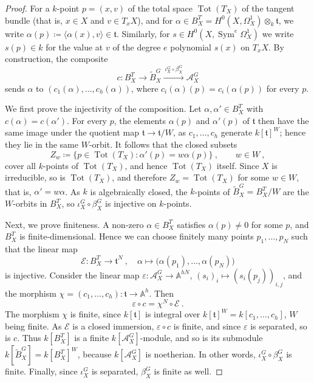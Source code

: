 \documentclass[11pt, a4paper]{amsart}
\theoremstyle{definition}
\theoremstyle{myitemstyle}
\newcommand{\A}{\mathbb{A}}
\newcommand{\mc}[1]{{\mathcal{#1}}}
\DeclareMathOperator{\Sym}{Sym}
\begin{document}
\begin{proof}
For a $k$-point $p=(x,v)$ of the total space $\operatorname{Tot}(T_X)$ of the tangent bundle  (that is, $x\in X$ and $v\in T_xX$), and for $\alpha\in B^T_X=H^0(X,\Omega^1_X)\otimes_k\mathfrak t$, we write $\alpha(p)\coloneqq\langle\alpha(x),v\rangle\in\mathfrak t$. Similarly, for $s\in H^0(X,\Sym^e\Omega^1_X)$ we write $s(p)\in k$ for the value at $v$ of the degree $e$ polynomial $s(x)$ on $T_xX$. By construction, the composite
\[
    c\colon B^T_X\longrightarrow\widetilde B^G_X\xrightarrow{\ \iota^G_X\circ\beta^G_X\ }\mc A^G_X
\]
sends $\alpha$ to $(c_1(\alpha),\ldots,c_h(\alpha))$, where $c_i(\alpha)(p)=c_i(\alpha(p))$ for every $p$.
 
We first prove the  injectivity of the composition. Let $\alpha,\alpha'\in B^T_X$ with $c(\alpha)=c(\alpha')$. For every $p$, the elements $\alpha(p)$ and $\alpha'(p)$ of $\mathfrak t$ then have the same image under the quotient map $\mathfrak t\to\mathfrak t/W$, as $c_1,\ldots,c_h$ generate $k[\mathfrak t]^W$; hence they lie in the same $W$-orbit. It follows that the closed subsets
\[
    Z_w\coloneqq\{p\in\operatorname{Tot}(T_X):\alpha'(p)=w\alpha(p)\}\ ,\qquad w\in W\ ,
\]
cover all $k$-points of $\operatorname{Tot}(T_X)$, and hence $\operatorname{Tot}(T_X)$ itself. Since $X$ is irreducible, so is $\operatorname{Tot}(T_X)$, and therefore $Z_w=\operatorname{Tot}(T_X)$ for some $w\in W$, that is, $\alpha'=w\alpha$. As $k$ is algebraically closed, the $k$-points of $\widetilde B^G_X=B^T_X/W$ are the $W$-orbits in $B^T_X$, so $\iota^G_X\circ\beta^G_X$ is injective on $k$-points.
 
Next, we  prove finiteness. A non-zero $\alpha\in B^T_X$ satisfies $\alpha(p)\neq0$ for some $p$, and $B^T_X$ is finite-dimensional. Hence we can choose finitely many points $p_1,\ldots,p_N$ such that the linear map
\[
    \mathcal{E}\colon B^T_X\longrightarrow\mathfrak t^N\ ,\quad\alpha\longmapsto\big(\alpha(p_1),\ldots,\alpha(p_N)\big)
\]
is injective. Consider the linear map $\varepsilon\colon\mc A^G_X\to\A^{hN}$, $(s_i)_i\mapsto(s_i(p_j))_{i,j}$, and the morphism $\chi=(c_1,\ldots,c_h)\colon\mathfrak t\to\A^h$. Then
\[
    \varepsilon \circ c=\chi^N\circ \mathcal E\ .
\]
The morphism $\chi$ is finite, since $k[\mathfrak t]$ is integral over $k[\mathfrak t]^W=k[c_1,\ldots,c_h]$, $W$ being finite. As $\mathcal E$ is a closed immersion, $\varepsilon\circ c$ is finite, and since $\varepsilon$ is separated, so is $c$.
Thus $k[B^T_X]$ is a finite $k[\mc A^G_X]$-module, and so is its submodule $k[\widetilde B^G_X]=k[B^T_X]^W$, because $k[\mc A^G_X]$ is noetherian. In other words, $\iota^G_X\circ\beta^G_X$ is finite. Finally, since $\iota^G_X$ is separated, $\beta^G_X$ is finite as well.
\end{proof}
\end{document}
